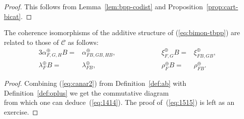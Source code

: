 \documentclass[10pt]{simplearticle}
\newcommand{\tikzinput}[1]{}
\begin{document}
\begin{proof}
This follows from Lemma~\ref{lem:bpp-codist} and Proposition~\ref{prop:cart-bicat}.
\end{proof}

\begin{lem}\label{lem:coher-component}
The coherence isomorphisms of the additive
structure of (\ref{eq:bimon-tbpp}) are related to those of $\mathcal{C}$
as follows:
\begin{alignat}{3}
\alpha^{\oplus}_{F,G,H}B= & \alpha^{\oplus}_{FB,GB,HB}, & \qquad\qquad &\ 
& \xi^{\oplus}_{F,G}B= & \xi^{\oplus}_{FB,GB},\label{eq:1414}\\
\lambda^{\oplus}_{F}B= & \lambda^{\oplus}_{FB}, &\ 
&\ 
& \rho^{\oplus}_{F}B= & \rho^{\oplus}_{FB}.\label{eq:1515}
\end{alignat}
\end{lem}

\begin{proof}
Combining (\ref{eq:canar2}) from Definition~\ref{def:ab} with Definition~\ref{def:oplus}
we get the commutative diagram
\[
\tikzinput{d437}
\]
from which one can deduce~(\ref{eq:1414}). The proof of~(\ref{eq:1515})
is left as an exercise.
\end{proof}
\end{document}
